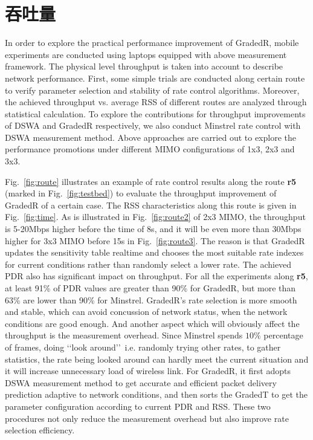 \section{吞吐量}
\label{sec:throughput}

In order to explore the practical performance improvement of GradedR, mobile experiments are conducted using laptops equipped with above measurement framework. The physical level throughput is taken into account to describe network performance. First, some simple trials are conducted along certain route to verify parameter selection and stability of rate control algorithms. Moreover, the achieved throughput vs. average RSS of different routes are analyzed through statistical calculation. To explore the contributions for throughput improvements of DSWA and GradedR respectively, we also conduct Minstrel rate control with DSWA measurement method. Above approaches are carried out to explore the performance promotions under different MIMO configurations of 1x3, 2x3 and 3x3.

Fig.~\ref{fig:route} illustrates an example of rate control results along the route \textbf{r5} (marked in Fig.~\ref{fig:testbed}) to evaluate the throughput improvement of GradedR of a certain case. The RSS characteristics along this route is given in Fig.~\ref{fig:time}. As is illustrated in Fig.~\ref{fig:route2} of 2x3 MIMO, the throughput is 5-20Mbps higher before the time of 8s, and it will be even more than 30Mbps higher for 3x3 MIMO before 15s in Fig.~\ref{fig:route3}. The reason is that GradedR updates the sensitivity table realtime and chooses the most suitable rate indexes for current conditions rather than randomly select a lower rate. The achieved PDR also has significant impact on throughput. For all the experiments along \textbf{r5}, at least 91\% of PDR values are greater than 90\% for GradedR, but more than 63\% are lower than 90\% for Minstrel. GradedR's rate selection is more smooth and stable, which can avoid concussion of network status, when the network conditions are good enough. And another aspect which will obviously affect the throughput is the measurement overhead. Since Minstrel spends $10\%$ percentage of frames, doing \lq\lq look around\rq\rq~i.e. randomly trying other rates, to gather statistics, the rate being looked around can hardly meet the current situation and it will increase unnecessary load of wireless link. For GradedR, it first adopts DSWA measurement method to get accurate and efficient packet delivery prediction adaptive to network conditions, and then sorts the GradedT to get the parameter configuration according to current PDR and RSS. These two procedures not only reduce the measurement overhead but also improve rate selection efficiency.

